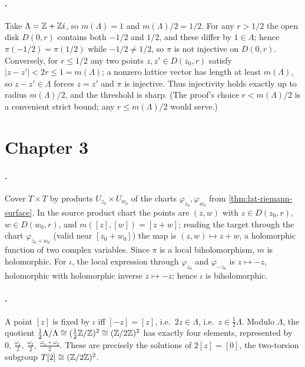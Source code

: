 \paragraph{.}
Take \(\Lambda = \mathbb{Z} + \mathbb{Z} i\), so \(m(\Lambda) = 1\) and \(m(\Lambda)/2 = 1/2\).
For any \(r > 1/2\) the open disk \(D(0, r)\) contains both \(-1/2\) and
\(1/2\), and these differ by \(1 \in \Lambda\); hence
\(\pi(-1/2) = \pi(1/2)\) while \(-1/2 \ne 1/2\), so \(\pi\) is not injective on
\(D(0,r)\). Conversely, for \(r \le 1/2\) any two points \(z, z' \in D(z_0, r)\)
satisfy \(|z - z'| < 2r \le 1 = m(\Lambda)\); a nonzero lattice vector has length
at least \(m(\Lambda)\), so \(z - z' \in \Lambda\) forces \(z = z'\) and \(\pi\)
is injective. Thus injectivity holds exactly up to radius \(m(\Lambda)/2\), and
the threshold is sharp. (The proof's choice \(r < m(\Lambda)/2\) is a convenient
strict bound; any \(r \le m(\Lambda)/2\) would serve.)

\section{Chapter 3}
\label{sec:soln-ch3}

\paragraph{.}
Cover \(T \times T\) by products \(U_{z_0} \times U_{w_0}\) of the charts
\(\varphi_{z_0}, \varphi_{w_0}\) from \cref{thm:lat-riemann-surface}. In the
source product chart the points are \((z, w)\) with \(z \in D(z_0, r)\),
\(w \in D(w_0, r)\), and \(m([z],[w]) = [z+w]\); reading the target through the
chart \(\varphi_{z_0 + w_0}\) (valid near \([z_0+w_0]\)) the map is
\((z, w) \mapsto z + w\), a holomorphic function of two complex variables. Since
\(\pi\) is a local biholomorphism, \(m\) is holomorphic. For \(\iota\), the
local expression through \(\varphi_{z_0}\) and \(\varphi_{-z_0}\) is
\(z \mapsto -z\), holomorphic with holomorphic inverse \(z \mapsto -z\); hence
\(\iota\) is biholomorphic.

\paragraph{.}
A point \([z]\) is fixed by \(\iota\) iff \([-z] = [z]\), i.e.\ \(2z \in
\Lambda\), i.e.\ \(z \in \tfrac12\Lambda\). Modulo \(\Lambda\), the quotient
\(\tfrac12\Lambda / \Lambda \cong (\tfrac12\mathbb{Z}/\mathbb{Z})^2 \cong (\mathbb{Z}/2\mathbb{Z})^2\) has
exactly four elements, represented by
\(0,\ \tfrac{\omega_1}{2},\ \tfrac{\omega_2}{2},\ \tfrac{\omega_1+\omega_2}{2}\).
These are precisely the solutions of \(2[z] = [0]\), the two-torsion subgroup
\(T[2] \cong (\mathbb{Z}/2\mathbb{Z})^2\).

